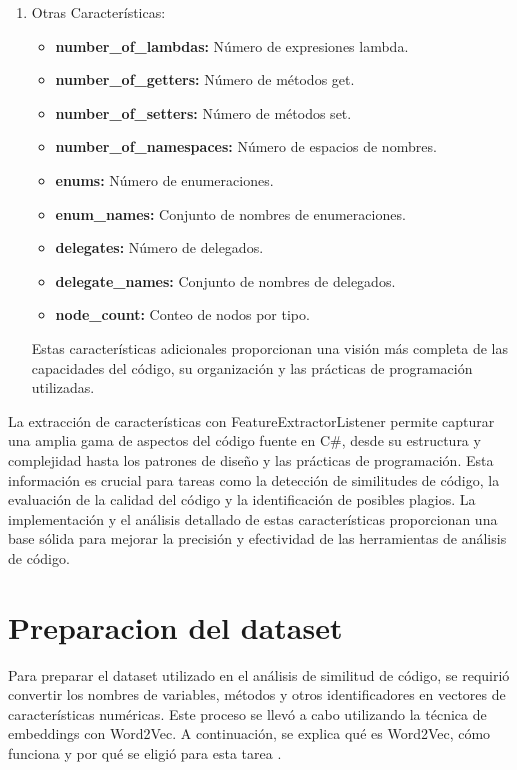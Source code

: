 \begin{enumerate}
    \item Otras Características:
    \begin{itemize}
        \item {\bf number\_of\_lambdas:} Número de expresiones lambda.
        \item {\bf number\_of\_getters:} Número de métodos get.
        \item {\bf number\_of\_setters:} Número de métodos set.
        \item {\bf number\_of\_namespaces:} Número de espacios de nombres.
        \item {\bf enums:} Número de enumeraciones.
        \item {\bf enum\_names:} Conjunto de nombres de enumeraciones.
        \item {\bf delegates:} Número de delegados.
        \item {\bf delegate\_names:} Conjunto de nombres de delegados.
        \item {\bf node\_count:} Conteo de nodos por tipo.
    \end{itemize}
    Estas características adicionales proporcionan una visión más completa de las capacidades del código, su organización y las prácticas de programación utilizadas.

 
\end{enumerate}
    
        
La extracción de características con FeatureExtractorListener permite capturar una amplia gama de aspectos del código fuente en C#, desde su estructura y complejidad hasta los patrones de diseño y las prácticas de programación. Esta información es crucial para tareas como la detección de similitudes de código, la evaluación de la calidad del código y la identificación de posibles plagios. La implementación y el análisis detallado de estas características proporcionan una base sólida para mejorar la precisión y efectividad de las herramientas de análisis de código.

\section{Preparacion del dataset}

Para preparar el dataset utilizado en el análisis de similitud de código, se requirió convertir los nombres de variables, métodos y otros identificadores en vectores de características numéricas. Este proceso se llevó a cabo utilizando la técnica de embeddings con Word2Vec. A continuación, se explica qué es Word2Vec, cómo funciona y por qué se eligió para esta tarea \cite{mikolov2013efficient}. \\

